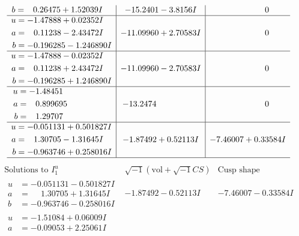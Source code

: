 \documentclass[1p]{elsarticle_modified}
\theoremstyle{definition}
\newcommand{\I}{\sqrt{-1}}
\begin{document}
$$\begin{array}{c|c|c}
\begin{aligned}
b &= \phantom{-}0.26475 + 1.52039 I\end{aligned}
 & -15.2401 - 3.8156 I & \phantom{-0.000000 } 0 \\ \hline\begin{aligned}
u &= -1.47888 + 0.02352 I \\
a &= \phantom{-}0.11238 - 2.43472 I \\
b &= -0.196285 - 1.246890 I\end{aligned}
 & -11.09960 + 2.70583 I & \phantom{-0.000000 } 0 \\ \hline\begin{aligned}
u &= -1.47888 - 0.02352 I \\
a &= \phantom{-}0.11238 + 2.43472 I \\
b &= -0.196285 + 1.246890 I\end{aligned}
 & -11.09960 - 2.70583 I & \phantom{-0.000000 } 0 \\ \hline\begin{aligned}
u &= -1.48451\phantom{ +0.000000I} \\
a &= \phantom{-}0.899695\phantom{ +0.000000I} \\
b &= \phantom{-}1.29707\phantom{ +0.000000I}\end{aligned}
 & -13.2474\phantom{ +0.000000I} & \phantom{-0.000000 } 0 \\ \hline\begin{aligned}
u &= -0.051131 + 0.501827 I \\
a &= \phantom{-}1.30705 - 1.31645 I \\
b &= -0.963746 + 0.258016 I\end{aligned}
 & -1.87492 + 0.52113 I & -7.46007 + 0.33584 I\\
 \hline 
 \end{array}$$\newpage$$\begin{array}{c|c|c}  
\text{Solutions to }I^u_{1}& \I (\text{vol} + \sqrt{-1}CS) & \text{Cusp shape}\\
 \hline 
\begin{aligned}
u &= -0.051131 - 0.501827 I \\
a &= \phantom{-}1.30705 + 1.31645 I \\
b &= -0.963746 - 0.258016 I\end{aligned}
 & -1.87492 - 0.52113 I & -7.46007 - 0.33584 I \\ \hline\begin{aligned}
u &= -1.51084 + 0.06009 I \\
a &= -0.09053 + 2.25061 I \\

\end{aligned}
\end{array}$$
\end{document}
